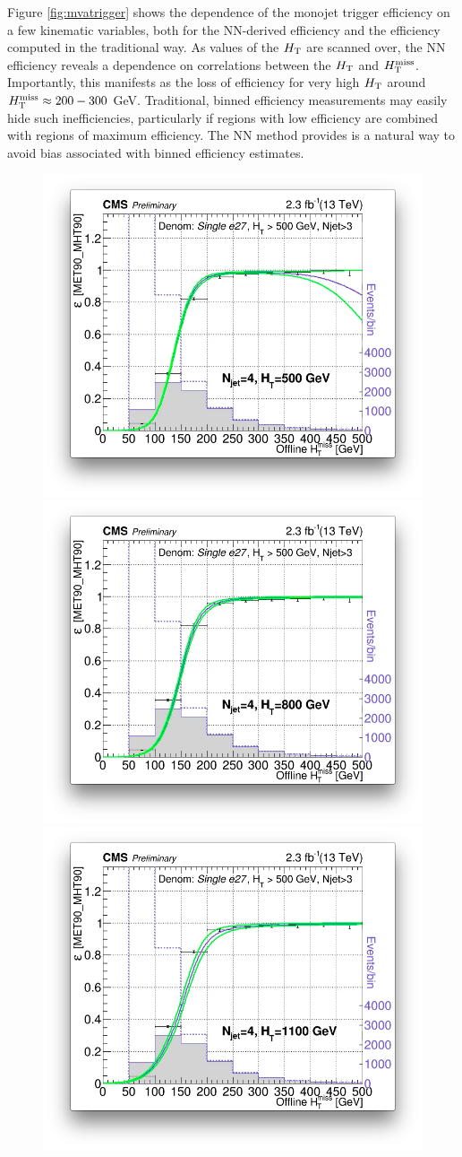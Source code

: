 Figure \ref{fig:mvatrigger} shows the dependence of the monojet trigger efficiency on a few kinematic variables, both for the NN-derived efficiency and the efficiency computed in the traditional way. As values of the $H_{\rm T}$ are scanned over, the NN efficiency reveals a dependence on correlations between the $H_{\rm T}$ and $H_{\text{T}}^{\rm miss}$. Importantly, this manifests as the loss of efficiency for very high $H_{\rm T}$ around $H_{\text{T}}^{\rm miss}\approx200-300$ GeV. Traditional, binned efficiency measurements may easily hide such inefficiencies, particularly if regions with low efficiency are combined with  regions of maximum efficiency. The NN method provides is a natural way to avoid bias associated with binned efficiency estimates. 
\begin{figure}[tb!]
  \begin{center}
    \includegraphics[width=0.49\linewidth]{figures/trigger/MonoTrigEff_Ht500.png}
    \includegraphics[width=0.49\linewidth]{figures/trigger/MonoTrigEff_Ht800.png}\\
        \includegraphics[width=0.49\linewidth]{figures/trigger/MonoTrigEff_Ht1100.png}

\end{center}
\end{figure}
